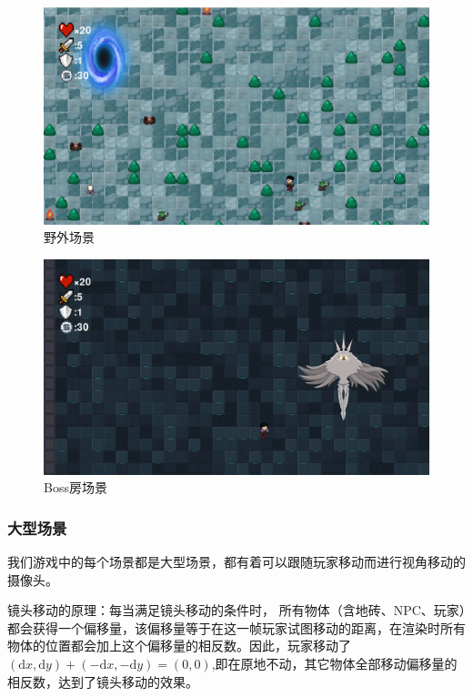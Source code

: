 \documentclass{ctexart}
\begin{document}
\begin{figure}
\centering
\includegraphics[width=0.7\linewidth]{场景2.png}
\caption{\label{fig:场景2}野外场景}
\end{figure}

\begin{figure}
\centering
\includegraphics[width=0.7\linewidth]{场景3.png}
\caption{\label{fig:场景3}Boss房场景}
\end{figure}

\subsubsection{大型场景}
我们游戏中的每个场景都是大型场景，都有着可以跟随玩家移动而进行视角移动的摄像头。

镜头移动的原理：每当满足镜头移动的条件时， 所有物体（含地砖、NPC、玩家）都会获得一个偏移量，该偏移量等于在这一帧玩家试图移动的距离，在渲染时所有物体的位置都会加上这个偏移量的相反数。因此，玩家移动了$\left ( \mathrm{d}x,\mathrm{d}y \right ) +  \left ( -\mathrm{d}x,-\mathrm{d}y \right )= \left ( 0,0 \right )$,即在原地不动，其它物体全部移动偏移量的相反数，达到了镜头移动的效果。 
\end{document}
